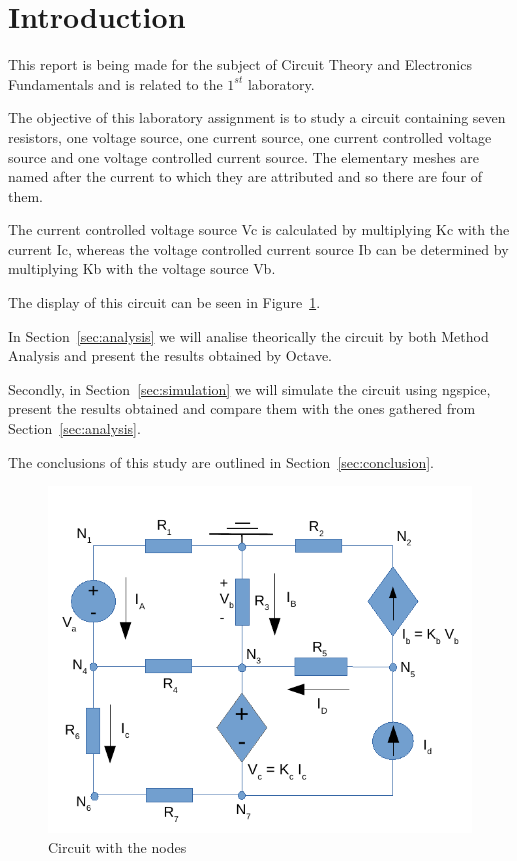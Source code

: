 \section{Introduction}
\label{sec:introduction}


\hspace{0,5cm} This report is being made for the subject of Circuit Theory and Electronics Fundamentals and is related to the $1^{st}$ laboratory.

The objective of this laboratory assignment is to study a circuit containing seven resistors, one voltage source, one current source, one current controlled voltage source and one voltage controlled current source. The elementary meshes are named after the current to which they are attributed and so there are four of them.

The current controlled voltage source Vc is calculated by multiplying Kc with the current Ic, whereas the voltage controlled current source Ib can be determined by multiplying Kb with the voltage source Vb.

The display of this circuit can be seen in Figure~\ref{fig:circuito}.

In Section~\ref{sec:analysis} we will analise theorically the circuit by both Method Analysis and present the results obtained by Octave.

Secondly, in Section~\ref{sec:simulation} we will simulate the circuit using ngspice, present the results obtained and compare them with the ones gathered from Section~\ref{sec:analysis}.

The conclusions of this study are outlined in Section~\ref{sec:conclusion}.

\begin{figure}[h] \centering
\includegraphics[width=0.7\linewidth]{circuito.pdf}
\caption{Circuit with the nodes} %
\label{fig:circuito}
\end{figure}


